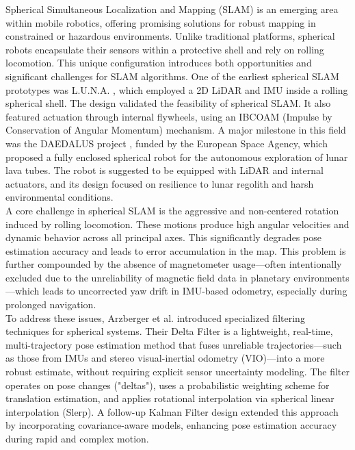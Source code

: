 \documentclass[conference]{IEEEtran}
\begin{document}
Spherical Simultaneous Localization and Mapping (SLAM) is an emerging area within mobile robotics, offering promising solutions for robust mapping in constrained or hazardous environments. Unlike traditional platforms, spherical robots encapsulate their sensors within a protective shell and rely on rolling locomotion. This unique configuration introduces both opportunities and significant challenges for SLAM algorithms. One of the earliest spherical SLAM prototypes was L.U.N.A. \cite{luna} , which employed a 2D LiDAR and IMU inside a rolling spherical shell. The design validated the feasibility of spherical SLAM. It also featured actuation through internal flywheels, using an IBCOAM (Impulse by Conservation of Angular Momentum) mechanism.
A major milestone in this field was the DAEDALUS project \cite{DAEDALUS}, funded by the European Space Agency, which proposed a fully enclosed spherical robot for the autonomous exploration of lunar lava tubes. The robot is suggested to be equipped with LiDAR and internal actuators, and its design focused on resilience to lunar regolith and harsh environmental conditions.\\
\hspace*{1em}A core challenge in spherical SLAM is the aggressive and non-centered rotation induced by rolling locomotion. These motions produce high angular velocities and dynamic behavior across all principal axes. This significantly degrades pose estimation accuracy and leads to error accumulation in the map. This problem is further compounded by the absence of magnetometer usage—often intentionally excluded due to the unreliability of magnetic field data in planetary environments—which leads to uncorrected yaw drift in IMU-based odometry, especially during prolonged navigation.\\
\hspace*{1em}To address these issues, Arzberger et al. \cite{Kalman_filter_sphere,sphere_Fabi_1,DeltaFilter} introduced specialized filtering techniques for spherical systems. Their Delta Filter is a lightweight, real-time, multi-trajectory pose estimation method that fuses unreliable trajectories—such as those from IMUs and stereo visual-inertial odometry (VIO)—into a more robust estimate, without requiring explicit sensor uncertainty modeling. The filter operates on pose changes ("deltas"), uses a probabilistic weighting scheme for translation estimation, and applies rotational interpolation via spherical linear interpolation (Slerp). A follow-up Kalman Filter design extended this approach by incorporating covariance-aware models, enhancing pose estimation accuracy during rapid and complex motion.\\
\end{document}
